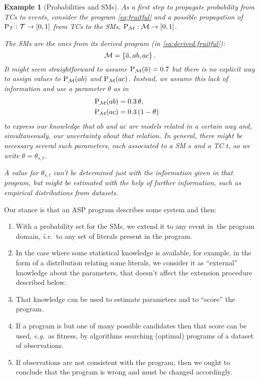 \documentclass{tlp}
\newtheorem{example}{Example}
\newcommand{\at}[1]{\ensuremath{\!\del{#1}}}        %
\newcommand{\cla}[1]{\ensuremath{{\cal #1}}}        %
\newcommand{\co}[1]{\ensuremath{\overline{#1}}}     %
\newcommand{\TCHOICEset}{\ensuremath{\cla{T}}}
\newcommand{\MODELset}{\ensuremath{\cla{M}}}
\newcommand{\prfunc}{\ensuremath{\mathrm{P}}}
\newcommand{\prd}[1]{\ensuremath{\prfunc_{#1}}}
\newcommand{\prT}{\prd{\TCHOICEset}}
\newcommand{\prM}{\prd{\MODELset}}
\begin{document}
\begin{example}[Probabilities and \aclp{SM}]%
  \label{running.example}%
  \em As a first step to propagate probability from \aclp{TC} to
  events, consider the program \cref{eq:fruitful} and a possible
  propagation of \(\prT:\TCHOICEset \to \intcc{0,1}\) from \aclp{TC}
  to the \aclp{SM}, \(\prM:\MODELset \to \intcc{0,1}\).

  The \aclp{SM} are the ones from its derived program (in
  \cref{eq:derived.fruitful}):
       \[ \MODELset = \set{\co{a}, ab, ac}. \]
  It might seem straightforward to assume \(\prM\at{\co{a}}=0.7\) but
  \emph{there is no explicit way to assign values to \(\prM\at{ab}\) and
    \(\prM\at{ac}\)}.  Instead, we assume this lack of information and use a
  parameter \(\theta\) as in
  \begin{equation*}
    \begin{aligned}
            \prM\at{ab} & = 0.3\, \theta, \cr
            \prM\at{ac} & = 0.3\, (1 - \theta)
    \end{aligned}
  \end{equation*}
  to express our knowledge that $ab$ and $ac$ are models related in a
  certain way and, simultaneously, our uncertainty about that
  relation.  In general, there might be necessary several such
  parameters, each associated to a \acl{SM} \(s\) and a \acl{TC}
  \(t\), so we write \(\theta=\theta_{s,t}\).

  A value for \(\theta_{s,t}\) can't be determined just with the
  information given in that program, but might be estimated with the
  help of further information, such as empirical distributions from
  datasets.
\end{example}

Our stance is that an \ac{ASP} program describes some system and then:

\begin{enumerate}
\item With a probability set for the \aclp{SM}, we extend it to any
  event in\ the program domain, \textit{i.e.}\ to any set of literals
  present in the program.

\item In the case where some statistical knowledge is available, for
  example, in the form of a distribution relating some literals, we
  consider it as ``external'' knowledge about the parameters, that
  doesn't affect the extension procedure described below.

\item That knowledge can be used to estimate parameters and to
  ``score'' the program.

\item\label{item:program.selection} If a program is but one of many
  possible candidates then that score can be used, \emph{e.g.}\ as
  fitness, by algorithms searching (optimal) programs of a dataset of
  observations.

\item If observations are not consistent with the program, then we
  ought to conclude that the program is wrong and must be changed
  accordingly.
\end{enumerate}
\end{document}
